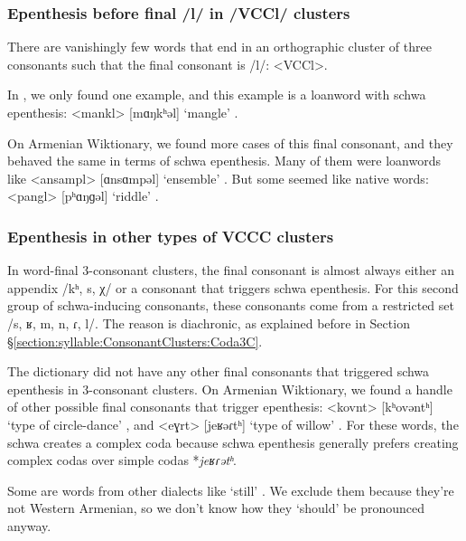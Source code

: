 	
	
	
	\subsubsection{Epenthesis before final /l/ in /VCCl/ clusters}\label{section:syllable:Final3C:Schwa:L}
	There are vanishingly few words that end in an orthographic cluster of three consonants such that the final consonant is /l/: <VCCl>.
	
	In \citeauthor{kouyoumdjian-1970-DictionaryArmenianEnglish}, we only found one example, and this example is a loanword with schwa epenthesis: <mankl> [mɑŋkʰəl] `mangle' .
	
	On Armenian Wiktionary, we found more cases of this final consonant, and they behaved the same in terms of schwa epenthesis. Many of them were loanwords like <ansampl> [ɑnsɑmpəl] `ensemble' . But some seemed like native words: <pangl> [pʰɑŋɡəl] `riddle' .  
	\subsubsection{Epenthesis in other types of VCCC clusters}\label{section:syllable:Final3C:Schwa:Other}
	
	In word-final 3-consonant clusters,   the final consonant is almost always either an appendix /kʰ, s, χ/ or a consonant that triggers schwa epenthesis. For this second group of schwa-inducing consonants, these consonants come from a restricted set  /s, ʁ, m, n, ɾ, l/. The reason is diachronic, as explained before in Section \S\ref{section:syllable:ConsonantClusters:Coda3C}. 
	
	The \citeauthor{kouyoumdjian-1970-DictionaryArmenianEnglish} dictionary did not have any other final consonants that triggered schwa epenthesis in 3-consonant clusters. On Armenian Wiktionary, we found a handle of other possible final consonants that trigger epenthesis: <kovnt> [kʰovəntʰ] `type of circle-dance' , and <eɣrt> [jeʁəɾtʰ] `type of willow' . For these words, the schwa creates a complex coda because schwa epenthesis generally prefers creating complex codas over simple codas *\textit{jeʁɾətʰ}. 
	
	
	
	Some are words from other dialects like `still' . We exclude them because they're not Western Armenian, so we don't know how they `should' be pronounced anyway.  
